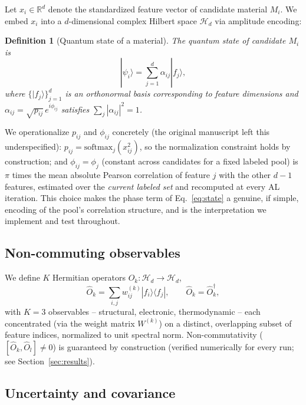 \documentclass[conference]{IEEEtran}
\newtheorem{definition}{Definition}
\begin{document}
Let $x_i \in \mathbb{R}^d$ denote the standardized feature vector of candidate material $M_i$. We embed $x_i$ into a $d$-dimensional complex Hilbert space $\mathcal{H}_d$ via amplitude encoding:

\begin{definition}[Quantum state of a material]\label{def:state}
The quantum state of candidate $M_i$ is
\begin{equation}
|\psi_i\rangle = \sum_{j=1}^{d} \alpha_{ij} |f_j\rangle, \label{eq:state}
\end{equation}
where $\{|f_j\rangle\}_{j=1}^{d}$ is an orthonormal basis corresponding to feature dimensions and $\alpha_{ij} = \sqrt{p_{ij}}\, e^{i\phi_{ij}}$ satisfies $\sum_j |\alpha_{ij}|^2 = 1$.
\end{definition}

We operationalize $p_{ij}$ and $\phi_{ij}$ concretely (the original manuscript left this underspecified): $p_{ij} = \mathrm{softmax}_j(x_{ij}^2)$, so the normalization constraint holds by construction; and $\phi_{ij} = \phi_j$ (constant across candidates for a fixed labeled pool) is $\pi$ times the mean absolute Pearson correlation of feature $j$ with the other $d-1$ features, estimated over the \emph{current labeled set} and recomputed at every AL iteration. This choice makes the phase term of Eq.~\eqref{eq:state} a genuine, if simple, encoding of the pool's correlation structure, and is the interpretation we implement and test throughout.

\subsection{Non-commuting observables}

We define $K$ Hermitian operators $\hat{O}_k : \mathcal{H}_d \to \mathcal{H}_d$,
\begin{equation}
\hat{O}_k = \sum_{i,j} w^{(k)}_{ij} |f_i\rangle\langle f_j|, \qquad \hat{O}_k = \hat{O}_k^\dagger, \label{eq:observable}
\end{equation}
with $K=3$ observables -- structural, electronic, thermodynamic -- each concentrated (via the weight matrix $W^{(k)}$) on a distinct, overlapping subset of feature indices, normalized to unit spectral norm. Non-commutativity ($[\hat{O}_k,\hat{O}_l]\neq 0$) is guaranteed by construction (verified numerically for every run; see Section~\ref{sec:results}).

\subsection{Uncertainty and covariance}
\end{document}
